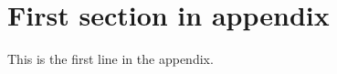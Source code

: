 \appendix


\appendixpage

\section{First section in appendix}
This is the first line in the appendix.


